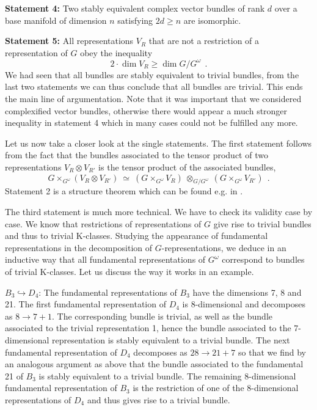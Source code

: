 \documentclass[12pt,a4paper]{article}
\newcommand{\embin}{{\hookrightarrow}}
\def\iG{G^\omega} %
\begin{document}
\begin{appendix}
\noindent
{\bf Statement 4:} Two stably equivalent 
complex vector bundles of rank $d$ over a
base manifold of dimension $n$ satisfying 
$2d\geq n$ are isomorphic.
\bigskip

\noindent
{\bf Statement 5:}
All representations $V_{R}$ that are not a restriction of
a representation of $G$ obey the inequality
\begin{equation}\label{eq:rankdimension}
2\cdot \dim V_{R} \geq \dim G/\iG \ \ .
\end{equation}
We had seen that all bundles are stably equivalent to trivial bundles,
from the last two statements we can thus conclude that all bundles are 
trivial. This ends the main line of argumentation. Note that it was 
important that we considered complexified vector bundles, otherwise 
there would appear a much stronger inequality in statement 4 which in 
many cases could not be fulfilled any more.
\medskip 

Let us now take a closer look at the single statements. The first
statement follows from the fact that the bundles associated to the
tensor product of two representations $V_{R}\otimes V_{R'}$ is the
tensor product of the associated bundles,
\[
G\times_{\iG} (V_{R}\otimes V_{R'}) \ \simeq \ ( G\times_{\iG} V_{R}
)\ \otimes_{G/\iG }\ ( G\times_{\iG} V_{R'}) \ \ .
\]
Statement 2 is a structure theorem which can be found e.g. in
\cite[Theorem~23.24]{FultonHarris}.
\smallskip

The third statement is much more technical. We have to check its
validity case by case. We know that restrictions of
representations of $G$ give rise to trivial bundles and thus to
trivial K-classes. Studying the appearance of fundamental
representations in the decomposition of $G$-representations, we deduce
in an inductive way that all fundamental representations of $\iG $
correspond to bundles of trivial K-classes.
Let us discuss the way it works in an example.
\smallskip

$B_{3}\embin D_{4}$: The fundamental representations of $B_{3}$ have
the dimensions 7, 8 and 21. The first fundamental representation of
$D_{4}$ is 8-dimensional and decomposes as $8\to 7+1$. The
corresponding bundle is trivial, as well as the bundle associated to
the trivial representation 1, hence the bundle associated to the
7-dimensional representation is stably equivalent to a trivial bundle.
The next fundamental representation of $D_{4}$ decomposes as $28\to
21+7$ so that we find by an analogous argument as above that the
bundle associated to the fundamental 21 of $B_{3}$ is stably equivalent
to a trivial bundle. The remaining 8-dimensional fundamental representation of
$B_{3}$ is the restriction of one of the 8-dimensional representations
of $D_{4}$ and thus gives rise to a trivial bundle.\smallskip


\end{appendix}
\end{document}
